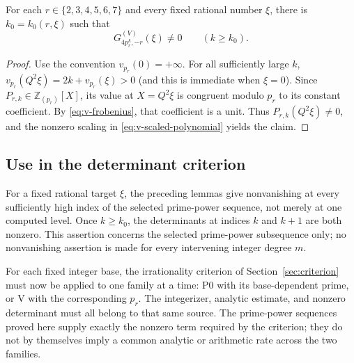 \begin{lemma}\label{lem:v-eventual-nonzero}
For each $r\in\{2,3,4,5,6,7\}$ and every fixed rational number $\xi$,
there is $k_0=k_0(r,\xi)$ such that
\[
 G^{(V)}_{4p_r^k,-r}(\xi)\ne0\qquad(k\ge k_0).
\]
\end{lemma}
\begin{proof}
Use the convention $v_{p_r}(0)=+\infty$.  For all sufficiently large $k$,
$v_{p_r}(Q^2\xi)=2k+v_{p_r}(\xi)>0$ (and this is immediate when
$\xi=0$).
Since $P_{r,k}\in\mathbb Z_{(p_r)}[X]$, its value at $X=Q^2\xi$ is
congruent modulo $p_r$ to its constant coefficient.  By
\eqref{eq:v-frobenius}, that coefficient is a unit.  Thus
$P_{r,k}(Q^2\xi)\ne0$, and the nonzero scaling in
\eqref{eq:v-scaled-polynomial} yields the claim.
\end{proof}

\subsection{Use in the determinant criterion}

For a fixed rational target $\xi$, the preceding lemmas give nonvanishing at
every sufficiently high index of the selected prime-power sequence, not
merely at one computed level.  Once $k\ge k_0$, the determinants at indices
$k$ and $k+1$ are both nonzero.  This assertion concerns the
selected prime-power subsequence only; no nonvanishing assertion is made for
every intervening integer degree $m$.

For each fixed integer base, the irrationality criterion of
Section~\ref{sec:criterion} must now be applied to one family at a time:
P0 with its base-dependent prime, or V with the corresponding $p_r$.
The integerizer, analytic estimate, and nonzero determinant must all belong
to that same source.  The prime-power sequences proved here supply exactly the
nonzero term required by the criterion; they do not by themselves imply a
common analytic or arithmetic rate across the two families.
